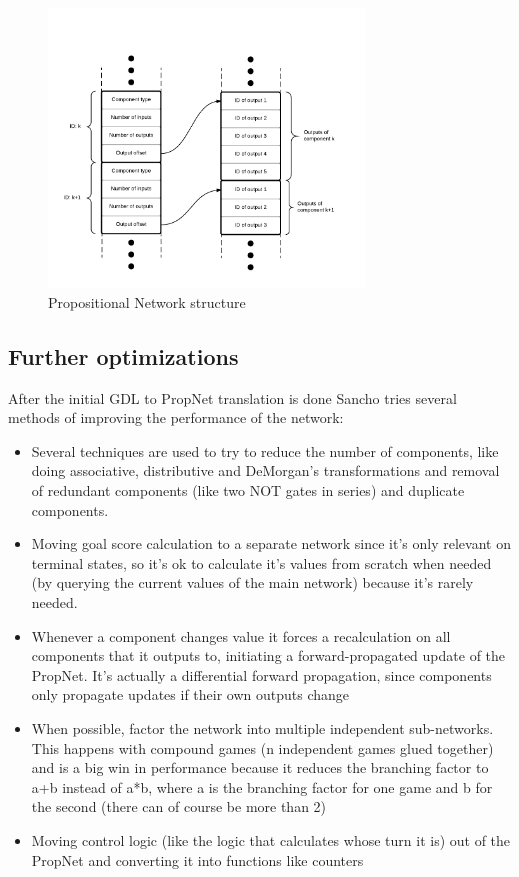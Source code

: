 \begin{figure}[h]
	\centering
	\includegraphics[width=0.75\textwidth]{images/PropNet_Structure.pdf}
	\caption{Propositional Network structure}
	\label{fig:propnet_structure}
\end{figure}

\subsection{Further optimizations}
After the initial GDL to PropNet translation is done Sancho tries several methods of improving the performance of the network:
\begin{itemize}
	\item Several techniques are used to try to reduce the number of components, like doing associative, distributive and DeMorgan's transformations and removal of redundant components (like two NOT gates in series) and duplicate components.
	
	\item Moving goal score calculation to a separate network since it's only relevant on terminal states, so it's ok to calculate it's values from scratch when needed (by querying the current values of the main network) because it's rarely needed.
	
	\item Whenever a component changes value it forces a recalculation on all components that it outputs to,  initiating a forward-propagated update of the PropNet.
	It's actually a differential forward propagation, since components only propagate updates if their own outputs change
	
	\item When possible, factor the network into multiple independent sub-networks. This happens with compound games (n independent games glued together) and is a big win in performance because it reduces the branching factor to a+b instead of a*b, where a is the branching factor for one game and b for the second (there can of course be more than 2)
	
	\item Moving control logic (like the logic that calculates whose turn it is) out of the PropNet and converting it into functions like counters
	
\end{itemize}


